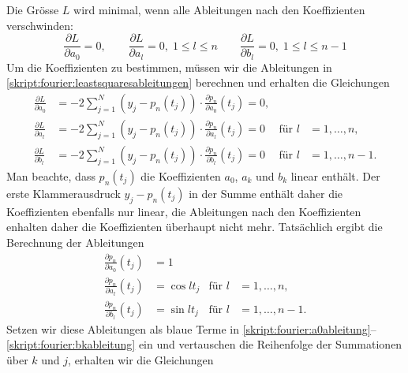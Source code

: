 Die Grösse $L$ wird minimal, wenn alle Ableitungen nach den Koeffizienten
verschwinden:
\begin{equation}
\frac{\partial L}{\partial a_0}=0,
\qquad
\frac{\partial L}{\partial a_l}=0, \;{1\le l\le n}
\qquad
\frac{\partial L}{\partial b_l}=0, \;{1\le l\le n-1}
\label{skript:fourier:leastsquaresableitungen}
\end{equation}
Um die Koeffizienten zu bestimmen, müssen wir die Ableitungen in
\eqref{skript:fourier:leastsquaresableitungen}
berechnen und erhalten die Gleichungen
\begin{align}
&&
\frac{\partial L}{\partial a_0}
&=
-2 \sum_{j=1}^N (y_j-p_n(t_j))\cdot \frac{\partial p_n}{\partial a_0}(t_j)=0,
&&
&&
\label{skript:fourier:a0ableitung}
\\
&&
\frac{\partial L}{\partial a_l}
&=
-2 \sum_{j=1}^N (y_j-p_n(t_j))\cdot \frac{\partial p_n}{\partial a_l}(t_j)=0
&\text{für }l&=1,\dots,n,
&&
\label{skript:fourier:akableitung}
\\
&&
\frac{\partial L}{\partial b_l}
&=
-2 \sum_{j=1}^N (y_j-p_n(t_j))\cdot \frac{\partial p_n}{\partial b_l}(t_j)=0
&\text{für }l&=1,\dots,n-1.
&&
\label{skript:fourier:bkableitung}
\end{align}
Man beachte, dass $p_n(t_j)$ die Koeffizienten $a_0$, $a_k$ und $b_k$
linear enthält.
Der erste Klammerausdruck $y_j-p_n(t_j)$ in der Summe enthält daher die
Koeffizienten ebenfalls nur linear, die Ableitungen nach den Koeffizienten
enhalten daher die Koeffizienten überhaupt nicht mehr.
Tatsächlich ergibt die Berechnung der Ableitungen
\begin{align}
&&&&&&
\frac{\partial p_n}{\partial a_0}(t_j)
&=
1
&&
&&&&&&
\label{skript:fourier:a0abl}
\\
&&&&&&
\frac{\partial p_n}{\partial a_l}(t_j)
&=
\cos lt_j
&\text{für }l&=1,\dots,n,
&&&&&&
\label{skript:fourier:akabl}
\\
&&&&&&
\frac{\partial p_n}{\partial b_l}(t_j)
&=
\sin lt_j
&\text{für }l&=1,\dots,n-1.
&&&&&&
\label{skript:fourier:bkabl}
\end{align}
%
Setzen wir diese Ableitungen als {\color{blue}blaue} Terme in
\eqref{skript:fourier:a0ableitung}--\eqref{skript:fourier:bkableitung} ein
und vertauschen die Reihenfolge der Summationen über $k$ und $j$,
erhalten wir die Gleichungen
%
